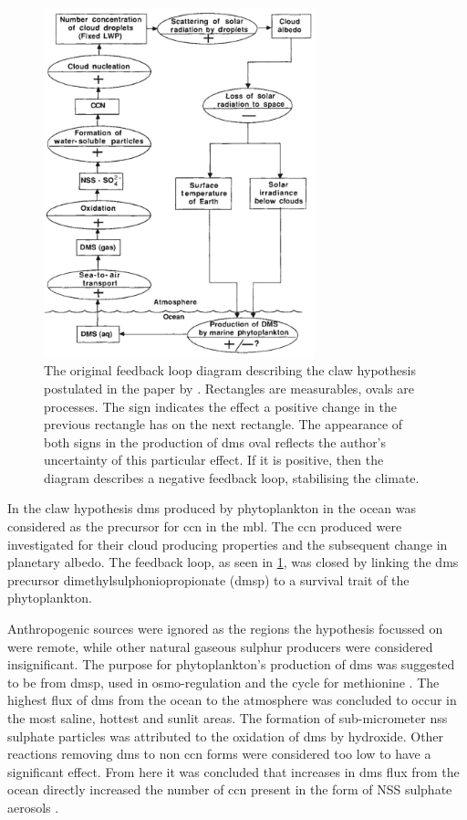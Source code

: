 		\begin{figure}[!htb]
	 	    \centering
	 	    \includegraphics[width=0.7\textwidth,natwidth=1038,natheight=1342]{Fig/Literature_Review/Original_Claw_Cycle.png}
	 	    \caption{The original feedback loop diagram describing the \gls{claw} hypothesis postulated in the paper by \citet{charlson:1987fw}. Rectangles are measurables, ovals are processes. The sign indicates the effect a positive change in the previous rectangle has on the next rectangle. The appearance of both signs in the production of \gls{dms} oval reflects the author's uncertainty of this particular effect. If it is positive, then the diagram describes a negative feedback loop, stabilising the climate.}
	 	    \label{fig:origclaw}
	 	\end{figure}

		In the \gls{claw} hypothesis \gls{dms} produced by phytoplankton in the ocean was considered as the precursor for \gls{ccn} in the \gls{mbl}. The \gls{ccn} produced were investigated for their cloud producing properties and the subsequent change in planetary albedo. The feedback loop, as seen in \cref{fig:origclaw}, was closed by linking the \gls{dms} precursor dimethylsulphoniopropionate (\gls{dmsp}) to a survival trait of the phytoplankton.

		Anthropogenic sources were ignored as the regions the hypothesis focussed on were remote, while other natural gaseous sulphur producers were considered insignificant. The purpose for phytoplankton's production of \gls{dms} was suggested to be from \gls{dmsp}, used in osmo-regulation and the cycle for methionine \citep{vairavamurthy:1985gw}. The highest flux of \gls{dms} from the ocean to the atmosphere was concluded to occur in the most saline, hottest and sunlit areas. The formation of sub-micrometer \gls{nss} sulphate particles was attributed to the oxidation of \gls{dms} by hydroxide. Other reactions removing \gls{dms} to non \gls{ccn} forms were considered too low to have a significant effect. From here it was concluded that increases in \gls{dms} flux from the ocean directly increased the number of \gls{ccn} present in the form of NSS sulphate aerosols \citep{charlson:1987fw}.

